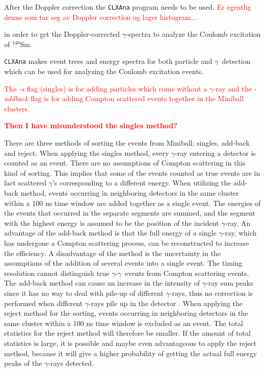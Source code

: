 \documentclass[twoside,english]{uiofysmaster/uiofysmaster}
\newcommand{\Sm}{$^{140}$Sm} %
\newcommand{\ga}{$\gamma$}
\begin{document}
After the Doppler correction the \texttt{CLXAna} program needs to be used. \textcolor{red}{Er egentlig denne som tar seg av Doppler correction og lager histogram...}


 in order to get the Doppler-corrected \ga-spectra to analyze the Coulomb excitation of \Sm.

\texttt{CLXAna} makes event trees and energy spectra for both particle and \ga\ detection which can be used for analyzing the Coulomb excitation events.


\bigskip


\textcolor{red}{The \textit{-s} flag (singles) is for adding particles which come without a \ga-ray and the \textit{-addback} flag is for adding Compton scattered events together in the Miniball clusters.}

\textcolor{red}{\textbf{Then I have misunderstood the singles method?}}

There are three methods of sorting the events from Miniball; singles, add-back and reject. 
When applying the singles method, every \ga-ray entering a detector is counted as an event.
There are no assumptions of Compton scattering in this kind of sorting. 
This implies that some of the events counted as true events are in fact scattered \ga's corresponding to a different energy.
When utilizing the add-back method, events occurring in neighboring detectors in the same cluster within a 100 ns time window are added together as a single event. 
The energies of the events that occurred in the separate segments are summed, and the segment with the highest energy is assumed to be the position of the incident \ga-ray.
An advantage of the add-back method is that the full energy of a single \ga-ray, which has undergone a Compton scattering process, can be reconstructed to increase the efficiency.
A disadvantage of the method is the uncertainty in the assumptions of the addition of several events into a single event. 
The timing resolution cannot distinguish true \ga-\ga\ events from Compton scattering events.
The add-back method can cause an increase in the intensity of \ga-ray sum peaks since it has no way to deal with pile-up of different \ga-rays, thus no correction is performed when different \ga-rays pile up in the detector \cite{Gaffney, MB-spect}.
When applying the reject method for the sorting, events occurring in neighboring detectors in the same cluster within a 100 ns time window is excluded as an event. 
The total statistics for the reject method will therefore be smaller. 
If the amount of total statistics is large, it is possible and maybe even advantageous to apply the reject method, because it will give a higher probability of getting the actual full energy peaks of the \ga-rays detected. 
\end{document}
